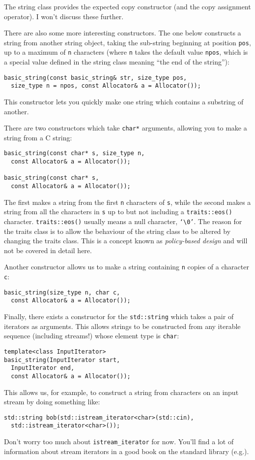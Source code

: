 \documentclass[a4paper]{scrartcl}
\begin{document}
The string class provides the expected copy constructor (and the copy assignment operator). I won't discuss these further.

There are also some more interesting constructors. The one below constructs a string from another string object, taking the sub-string beginning at position \texttt{pos}, up to a maximum of \texttt{n} characters (where \texttt{n} takes the default value \texttt{npos}, which is a special value defined in the string class meaning ``the end of the string''):
\begin{verbatim}
basic_string(const basic_string& str, size_type pos,
  size_type n = npos, const Allocator& a = Allocator());
\end{verbatim}
This constructor lets you quickly make one string which contains a substring of another.

There are two constructors which take \texttt{char*} arguments, allowing you to make a string from a C string:
\begin{verbatim}
basic_string(const char* s, size_type n,
  const Allocator& a = Allocator());

basic_string(const char* s,
  const Allocator& a = Allocator());
\end{verbatim}
The first makes a string from the first \texttt{n} characters of \texttt{s}, while the second makes a string from all the characters in \texttt{s} up to but not including a \texttt{traits::eos()} character. \texttt{traits::eos()} usually means a null character, \texttt{`\textbackslash 0'}. The reason for the traits class is to allow the behaviour of the string class to be altered by changing the traits class. This is a concept known as \emph{policy-based design} and will not be covered in detail here.

Another constructor allows us to make a string containing \texttt{n} copies of a character \texttt{c}:
\begin{verbatim}
basic_string(size_type n, char c,
  const Allocator& a = Allocator());
\end{verbatim}

Finally, there exists a constructor for the \texttt{std::string} which takes a pair of iterators as arguments. This allows strings to be constructed from any iterable sequence (including streams!) whose element type is \texttt{char}:
\begin{verbatim}
template<class InputIterator>
basic_string(InputIterator start,
  InputIterator end,
  const Allocator& a = Allocator());
\end{verbatim}
This allows us, for example, to construct a string from characters on an input stream by doing something like:
\begin{verbatim}
std::string bob(std::istream_iterator<char>(std::cin),
  std::istream_iterator<char>());
\end{verbatim}
Don't worry too much about \texttt{istream\_iterator} for now. You'll find a lot of information about stream iterators in a good book on the standard library (e.g.\cite{StandardLibrary}).
\end{document}
